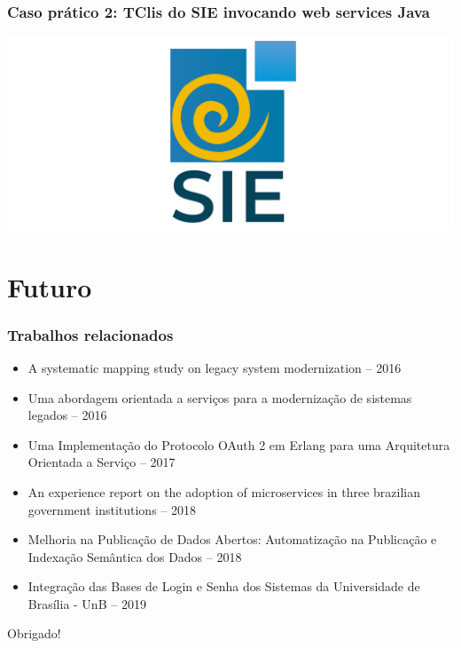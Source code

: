 \documentclass{beamer}
\begin{document}
\begin{frame}
  \frametitle{Caso prático 2: TClis do SIE invocando web services Java}

	\centering
	\includegraphics[scale=0.4]{img/sie.png}
  
\end{frame}


\section{Futuro}


\begin{frame}
\frametitle{Trabalhos relacionados}

	\small{
		\begin{itemize}
			\item<1->A systematic mapping study on legacy system modernization -- 2016
			\item<1->Uma abordagem orientada a serviços para a modernização de sistemas legados -- 2016
			\item<1->Uma Implementação do Protocolo OAuth 2 em Erlang para uma Arquitetura Orientada a Serviço -- 2017
			\item<1->An experience report on the adoption of microservices in three brazilian government institutions -- 2018
			\item<1->Melhoria na Publicação de Dados Abertos: Automatização na Publicação e Indexação Semântica dos Dados -- 2018
			\item<1->Integração das Bases de Login e Senha dos Sistemas da Universidade de Brasília - UnB -- 2019
		\end{itemize}
	}

\end{frame}



\begin{frame}[c]{ }
\centering
  \huge{Obrigado!}
\end{frame}
\end{document}
